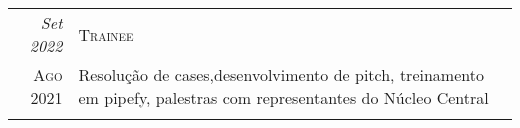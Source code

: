 \begin{framed}
\begin{tabular}{r|p{15cm}}
\emph{Set 2022}   & \textsc{Trainee}                                                                                                                                                                                                                                                                                              \\
\textsc{Ago 2021} & \footnotesize{Resolução de cases,desenvolvimento de pitch, treinamento em pipefy, palestras com representantes do Núcleo Central}                                                                                                                                                                             \\
\multicolumn{2}{c}{}                                                                                                                                                                                                                                                                                                              \\
\end{tabular}

\end{framed}
